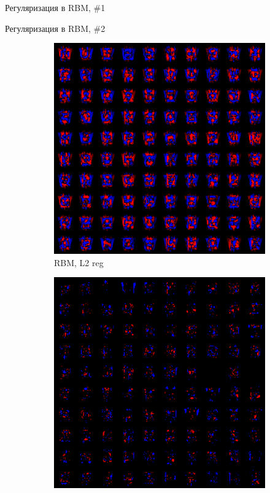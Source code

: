 \documentclass[10pt]{beamer}
\begin{document}
\begin{frame}{Регуляризация в RBM, \#1}
\end{frame}

\begin{frame}{Регуляризация в RBM, \#2}

\begin{figure}
        \begin{subfigure}[b]{0.5\textwidth}
                \includegraphics[width=1\textwidth]{images/rbm_colmap_l2.png}
                \caption{RBM, L2 reg}                
        \end{subfigure}%
        \begin{subfigure}[b]{0.5\textwidth}
                \includegraphics[width=1\textwidth]{images/rbm_colmap_l1.png}

\end{subfigure}
\end{figure}
\end{frame}
\end{document}
